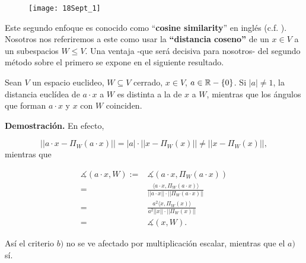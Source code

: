 \begin{figure}[H]
	\centering
	\texttt{[image: 18Sept\_1]} 
\end{figure}	

Este segundo
enfoque es conocido como ``\textbf{cosine similarity}'' en
inglés (c.f. \cite{cosineSim}). Nosotros nos referiremos a 
este como usar la \textbf{``distancia coseno''} de un $x \in V$
a un subespacios $W \leq V$.
Una ventaja -que será decisiva
para nosotros- del segundo método sobre el primero se
expone en el siguiente resultado.


\begin{prop}
\label{prop: angulo se conserva bajo mult. esc.}
Sean $V$ un espacio euclideo, $W \subseteq V$ cerrado, $x \in V$,
$a \in \mathbb{R} - \{ 0 \}$. Si $|a| \neq 1$, la distancia euclídea 
de $a \cdot x$ a $W$ es distinta
a la de $x$ a $W$, mientras que los 
ángulos que forman $a \cdot x$ y $x$
con $W$ coinciden.
\end{prop}
\noindent
\textbf{Demostración.}
En efecto, 

\[
|| a \cdot x - \Pi_{W}(a \cdot x) || = |a| \cdot || x - \Pi_{W}(x) ||
\neq || x - \Pi_{W}(x) ||, 
\]
mientras que

\begin{align*}
\measuredangle (a \cdot x, W):=& \measuredangle(a \cdot x, \Pi_{W}(a \cdot x)) \\
= & \frac{\langle a \cdot x , \Pi_{W}(a \cdot x) \rangle}{|| a \cdot x || \cdot 
|| \Pi_{W}(a \cdot x)  ||} \\
= & \frac{a^{2}  \langle   x , \Pi_{W}(x) \rangle}{a^{2} ||  x || \cdot 
|| \Pi_{W}( x)  ||}  \\
= & \measuredangle (x, W).
\end{align*}


\QEDB
\vspace{0.2cm}

Así el criterio $b)$ no se ve afectado por multiplicación escalar,
mientras que el $a)$ sí.


\QEDB
\vspace{0.2cm}

